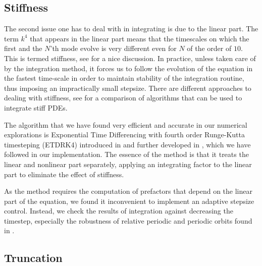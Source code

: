 \subsection{Stiffness}

The second issue one has to deal with in integrating  is due to the linear part.
The term $k^4$ that appears in the linear part means that the timescales on which the first
and the $N$'th mode evolve is very different even for $N$ of the order of $10$. This
is termed stiffness, see  for a nice discussion. In practice, unless taken care
of by the integration method, it forces us to follow the evolution of the equation in the
fastest time-scale in order to maintain stability of the integration routine, thus imposing an
impractically small stepsize. There are different approaches to dealing with stiffness,
see  for a comparison of algorithms that can be used to integrate stiff PDEs.

The algorithm that we have found very efficient and accurate in our numerical explorations
is Exponential Time Differencing with fourth order Runge-Kutta timesteping (ETDRK4)
introduced in  and further developed in , which we have
followed in our implementation. The essence of the method is that it treats the linear
and nonlinear part separately, applying an integrating factor to the linear part to eliminate
the effect of stiffness.

As the method requires the computation of prefactors that depend on the linear part of
the equation, we found it inconvenient to implement an adaptive stepsize control. Instead,
we check the results of integration against decreasing the timestep, especially the
robustness of relative periodic and periodic orbits found in .

\subsection{Truncation}

